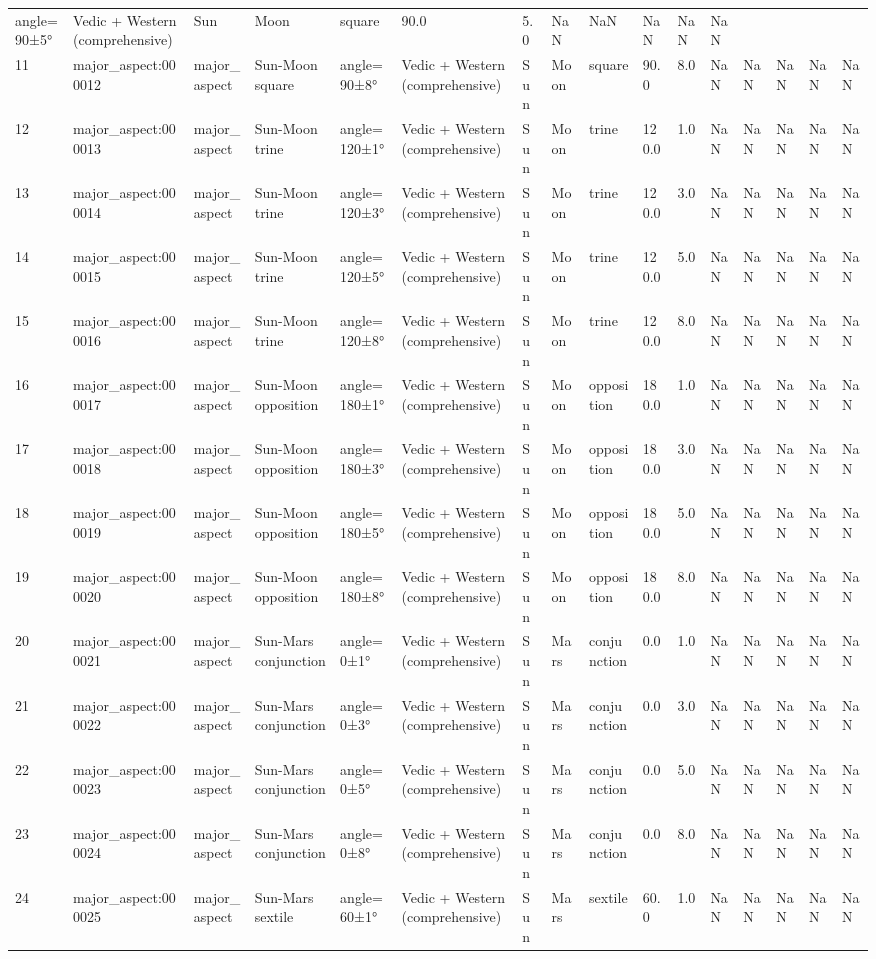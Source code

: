 \documentclass[
  11pt,
  a4paper,
  oneside,
  openany]{article}
\begin{document}
\begin{longtable}[]{@{}llllllllllllllll@{}}
angle=90±5° & Vedic + Western (comprehensive) & Sun & Moon & square &
90.0 & 5.0 & NaN & NaN & NaN & NaN & NaN \\
11 & major\_aspect:000012 & major\_aspect & Sun-Moon square &
angle=90±8° & Vedic + Western (comprehensive) & Sun & Moon & square &
90.0 & 8.0 & NaN & NaN & NaN & NaN & NaN \\
12 & major\_aspect:000013 & major\_aspect & Sun-Moon trine &
angle=120±1° & Vedic + Western (comprehensive) & Sun & Moon & trine &
120.0 & 1.0 & NaN & NaN & NaN & NaN & NaN \\
13 & major\_aspect:000014 & major\_aspect & Sun-Moon trine &
angle=120±3° & Vedic + Western (comprehensive) & Sun & Moon & trine &
120.0 & 3.0 & NaN & NaN & NaN & NaN & NaN \\
14 & major\_aspect:000015 & major\_aspect & Sun-Moon trine &
angle=120±5° & Vedic + Western (comprehensive) & Sun & Moon & trine &
120.0 & 5.0 & NaN & NaN & NaN & NaN & NaN \\
15 & major\_aspect:000016 & major\_aspect & Sun-Moon trine &
angle=120±8° & Vedic + Western (comprehensive) & Sun & Moon & trine &
120.0 & 8.0 & NaN & NaN & NaN & NaN & NaN \\
16 & major\_aspect:000017 & major\_aspect & Sun-Moon opposition &
angle=180±1° & Vedic + Western (comprehensive) & Sun & Moon & opposition
& 180.0 & 1.0 & NaN & NaN & NaN & NaN & NaN \\
17 & major\_aspect:000018 & major\_aspect & Sun-Moon opposition &
angle=180±3° & Vedic + Western (comprehensive) & Sun & Moon & opposition
& 180.0 & 3.0 & NaN & NaN & NaN & NaN & NaN \\
18 & major\_aspect:000019 & major\_aspect & Sun-Moon opposition &
angle=180±5° & Vedic + Western (comprehensive) & Sun & Moon & opposition
& 180.0 & 5.0 & NaN & NaN & NaN & NaN & NaN \\
19 & major\_aspect:000020 & major\_aspect & Sun-Moon opposition &
angle=180±8° & Vedic + Western (comprehensive) & Sun & Moon & opposition
& 180.0 & 8.0 & NaN & NaN & NaN & NaN & NaN \\
20 & major\_aspect:000021 & major\_aspect & Sun-Mars conjunction &
angle=0±1° & Vedic + Western (comprehensive) & Sun & Mars & conjunction
& 0.0 & 1.0 & NaN & NaN & NaN & NaN & NaN \\
21 & major\_aspect:000022 & major\_aspect & Sun-Mars conjunction &
angle=0±3° & Vedic + Western (comprehensive) & Sun & Mars & conjunction
& 0.0 & 3.0 & NaN & NaN & NaN & NaN & NaN \\
22 & major\_aspect:000023 & major\_aspect & Sun-Mars conjunction &
angle=0±5° & Vedic + Western (comprehensive) & Sun & Mars & conjunction
& 0.0 & 5.0 & NaN & NaN & NaN & NaN & NaN \\
23 & major\_aspect:000024 & major\_aspect & Sun-Mars conjunction &
angle=0±8° & Vedic + Western (comprehensive) & Sun & Mars & conjunction
& 0.0 & 8.0 & NaN & NaN & NaN & NaN & NaN \\
24 & major\_aspect:000025 & major\_aspect & Sun-Mars sextile &
angle=60±1° & Vedic + Western (comprehensive) & Sun & Mars & sextile &
60.0 & 1.0 & NaN & NaN & NaN & NaN & NaN \\
\end{longtable}
\end{document}
